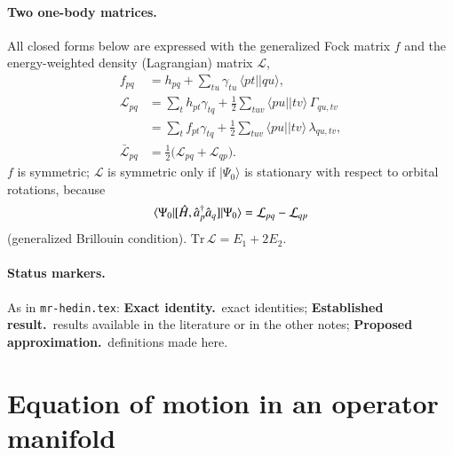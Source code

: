\documentclass[aip,jcp,reprint,noshowkeys,superscriptaddress]{revtex4-1}
\newcommand{\cre}[1]{\Hat{a}_{#1}^{\dag}}
\newcommand{\ani}[1]{\Hat{a}_{#1}}
\newcommand{\Lag}{\mathcal{L}}
\newcommand{\sLag}{\bar{\mathcal L}}
\newcommand{\Exact}{\textbf{Exact identity.}\ }
\newcommand{\Established}{\textbf{Established result.}\ }
\newcommand{\Proposed}{\textbf{Proposed approximation.}\ }
\begin{document}
\paragraph*{Two one-body matrices.}
All closed forms below are expressed with the generalized Fock matrix $f$ and
the energy-weighted density (Lagrangian) matrix $\Lag$,
\begin{align}
  f_{pq}&=h_{pq}+\sum_{tu}\gamma_{tu}\,\langle pt||qu\rangle ,
  \label{eq:genfock}\\
  \Lag_{pq}&=\sum_{t}h_{pt}\gamma_{tq}+\frac12\sum_{tuv}\langle pu||tv\rangle\,\Gamma_{qu,tv}
  \nonumber\\
  &=\sum_t f_{pt}\gamma_{tq}+\frac12\sum_{tuv}\langle pu||tv\rangle\,\lambda_{qu,tv},
  \label{eq:lagrangian}\\
  \sLag_{pq}&=\tfrac12\bigl(\Lag_{pq}+\Lag_{qp}\bigr).
  \label{eq:symlag}
\end{align}
$f$ is symmetric; $\Lag$ is symmetric only if $|\Psi_0\rangle$ is stationary
with respect to orbital rotations, because
\begin{equation}
  \langle\Psi_0|[\hat H,\cre{p}\ani{q}]|\Psi_0\rangle=\Lag_{pq}-\Lag_{qp}
  \label{eq:brillouin}
\end{equation}
(generalized Brillouin condition).  $\mathrm{Tr}\,\Lag=E_1+2E_2$.

\paragraph*{Status markers.}
As in \texttt{mr-hedin.tex}: \Exact exact identities; \Established results
available in the literature or in the other notes; \Proposed definitions made
here.

\section{Equation of motion in an operator manifold}
\label{sec:eom}
\end{document}
